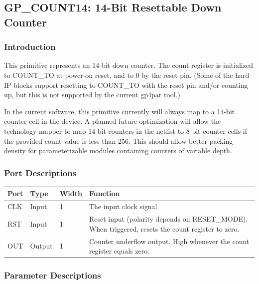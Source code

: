 \documentclass{article}
\begin{document}

\pagebreak
\subsection{GP\_COUNT14: 14-Bit Resettable Down Counter}

\subsubsection{Introduction}
This primitive represents an 14-bit down counter. The count register is initialized to COUNT\_TO at power-on reset, and 
to 0 by the reset pin. (Some of the hard IP blocks support resetting to COUNT\_TO with the reset pin and/or counting 
up, but this is not supported by the current gp4par tool.)

In the current software, this primitive currently will always map to a 14-bit counter cell in the device. A planned 
future optimization will allow the technology mapper to map 14-bit counters in the netlist to 8-bit counter cells if 
the provided count value is less than 256. This should allow better packing density for parameterizable modules 
containing counters of variable depth.

\subsubsection{Port Descriptions}

\begin{tabularx}{5in}{|l|l|l|X|}
\hline
{\bfseries Port} & {\bfseries Type} & {\bfseries Width} & {\bfseries Function} \\
\hline
CLK & Input & 1 & The input clock signal\\
\hline
RST & Input & 1 & Reset input (polarity depends on RESET\_MODE). When triggered, resets the count register to zero. \\
\hline
OUT & Output & 1 & Counter underflow output. High whenever the count register equals zero. \\
\hline
\end{tabularx}

\subsubsection{Parameter Descriptions}
\end{document}
